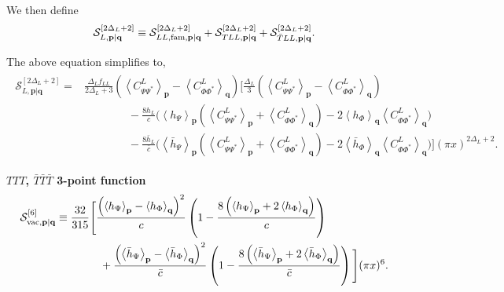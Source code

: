 \documentclass[11pt]{article}
\newcommand{\nn}{\nonumber}
\begin{document}
We then define
\begin{align}
    \mathcal S_{L,\mathbf p|\mathbf q}^{[2\Delta_L+2]}
    \equiv
    \mathcal S_{LL,{\rm fam},\mathbf p|\mathbf q}^{[2\Delta_L+2]}
    +
    \mathcal S_{TLL,\mathbf p|\mathbf q}^{[2\Delta_L+2]}
    +
    \mathcal S_{\bar TLL,\mathbf p|\mathbf q}^{[2\Delta_L+2]} .
\end{align}

The above equation simplifies to,
\begin{align}
\begin{aligned}
\mathcal S_{L,\mathbf p|\mathbf q}^{[2\Delta_L+2]}
={}&
\frac{\Delta_L f_{LL}}
{2\Delta_L+3}
\left(
\left\langle C_{\Psi\Psi^*}^{L}\right\rangle_{\mathbf p}
-
\left\langle C_{\Phi\Phi^*}^{L}\right\rangle_{\mathbf q}
\right)
\Bigg[
\frac{\Delta_L}{3}
\left(
\left\langle C_{\Psi\Psi^*}^{L}\right\rangle_{\mathbf p}
-
\left\langle C_{\Phi\Phi^*}^{L}\right\rangle_{\mathbf q}
\right)
\\
&\qquad\qquad
-\frac{8h_L}{c}
\Bigg(
\left\langle h_\Psi\right\rangle_{\mathbf p}
\left(
\left\langle C_{\Psi\Psi^*}^{L}\right\rangle_{\mathbf p}
+
\left\langle C_{\Phi\Phi^*}^{L}\right\rangle_{\mathbf q}
\right)
-
2
\left\langle h_\Phi\right\rangle_{\mathbf q}
\left\langle C_{\Phi\Phi^*}^{L}\right\rangle_{\mathbf q}
\Bigg)
\\
&\qquad\qquad
-\frac{8\bar h_L}{\bar c}
\Bigg(
\left\langle \bar h_\Psi\right\rangle_{\mathbf p}
\left(
\left\langle C_{\Psi\Psi^*}^{L}\right\rangle_{\mathbf p}
+
\left\langle C_{\Phi\Phi^*}^{L}\right\rangle_{\mathbf q}
\right)
-
2
\left\langle \bar h_\Phi\right\rangle_{\mathbf q}
\left\langle C_{\Phi\Phi^*}^{L}\right\rangle_{\mathbf q}
\Bigg)
\Bigg]
(\pi x)^{2\Delta_L+2}.
\end{aligned}
\end{align}

\textbf{$TTT$, $\bar T\bar T\bar T$ 3-point function}
\begin{align}
    \mathcal S_{{\rm vac},\mathbf p|\mathbf q}^{[6]}
    &\equiv
    \frac{32}{315}
    \Bigg[
    \frac{
    \left(
    \left\langle h_\Psi\right\rangle_{\mathbf p}
    -
    \left\langle h_\Phi\right\rangle_{\mathbf q}
    \right)^2
    }{c}
    \left(
    1-
    \frac{
    8\left(
    \left\langle h_\Psi\right\rangle_{\mathbf p}
    +
    2\left\langle h_\Phi\right\rangle_{\mathbf q}
    \right)
    }{c}
    \right)
    \nn\\
    &\qquad\qquad
    +
    \frac{
    \left(
    \left\langle \bar h_\Psi\right\rangle_{\mathbf p}
    -
    \left\langle \bar h_\Phi\right\rangle_{\mathbf q}
    \right)^2
    }{\bar c}
    \left(
    1-
    \frac{
    8\left(
    \left\langle \bar h_\Psi\right\rangle_{\mathbf p}
    +
    2\left\langle \bar h_\Phi\right\rangle_{\mathbf q}
    \right)
    }{\bar c}
    \right)
    \Bigg]
    (\pi x)^6 .
\end{align}
\end{document}
